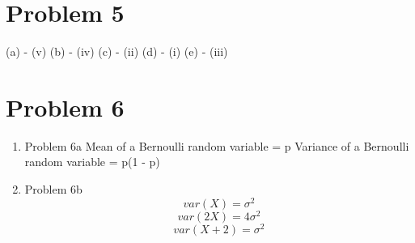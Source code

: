 \documentclass[11pt]{article}
\newcommand{\solution}[1]{{{\color{blue}{\bf Solution:} {#1}}}}
\begin{document}
\newpage

\section{Problem 5}

(a) - (v) \newline
(b) - (iv) \newline
(c) - (ii) \newline
(d) - (i) \newline
(e) - (iii) 

\newpage
\section{Problem 6}
\begin{enumerate}
\item Problem 6a
\solution{}
Mean of a Bernoulli random variable = p \newline
Variance of a Bernoulli random variable = p(1 - p)

\item Problem 6b
\solution{} \newline
$$var(X) = \sigma ^ 2$$
$$var(2X) = 4 \sigma ^ 2$$
$$var(X + 2) =  \sigma ^ 2$$
\end{enumerate}

\newpage
\end{document}
